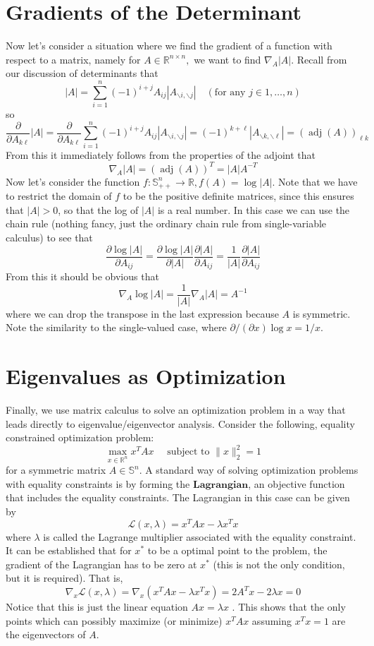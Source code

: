 \documentclass[10pt,a4paper,oneside]{article}
\begin{document}
\section{Gradients of the Determinant}
Now let's consider a situation where we find the gradient of a function with respect to a matrix, namely for \(A \in \mathbb{R}^{n \times n},\) we want to find \(\nabla_{A}|A| .\) Recall from our discussion of determinants that
\[
|A|=\sum_{i=1}^{n}(-1)^{i+j} A_{i j}\left|A_{\backslash i, \backslash j}\right| \quad(\text {for any } j \in 1, \ldots, n)
\]
so
\[
\frac{\partial}{\partial A_{k \ell}}|A|=\frac{\partial}{\partial A_{k \ell}} \sum_{i=1}^{n}(-1)^{i+j} A_{i j}\left|A_{\backslash i, \backslash j}\right|=(-1)^{k+\ell}\left|A_{\backslash k, \backslash\ell}\right|=(\operatorname{adj}(A))_{\ell k}
\]
From this it immediately follows from the properties of the adjoint that
\[
\nabla_{A}|A|=(\operatorname{adj}(A))^{T}=|A| A^{-T}
\]
Now let's consider the function \(f : \mathbb{S}_{++}^{n} \rightarrow \mathbb{R}, f(A)=\log |A|\). Note that we have to restrict the domain of \(f\) to be the positive definite matrices, since this ensures that \(|A|>0\), so that the log of \(|A|\) is a real number. In this case we can use the chain rule (nothing fancy, just the ordinary chain rule from single-variable calculus) to see that
\[
\frac{\partial \log |A|}{\partial A_{i j}}=\frac{\partial \log |A|}{\partial|A|} \frac{\partial|A|}{\partial A_{i j}}=\frac{1}{|A|} \frac{\partial|A|}{\partial A_{i j}}
\]
From this it should be obvious that
\[
\nabla_{A} \log |A|=\frac{1}{|A|} \nabla_{A}|A|=A^{-1}
\]
where we can drop the transpose in the last expression because \(A\) is symmetric. Note the similarity to the single-valued case, where \(\partial /(\partial x) \log x=1 / x\).
\section{Eigenvalues as Optimization}
Finally, we use matrix calculus to solve an optimization problem in a way that leads directly
to eigenvalue/eigenvector analysis. Consider the following, equality constrained optimization
problem:
\[
\max _{x \in \mathbb{R}^{n}} x^{T} A x \quad \text { subject to }\|x\|_{2}^{2}=1
\]
for a symmetric matrix \(A \in \mathbb{S}^{n}\). A standard way of solving optimization problems with equality constraints is by forming the $\bm{Lagrangian}$, an objective function that includes the equality constraints. The Lagrangian in this case can be given by
\[
\mathcal{L}(x, \lambda)=x^{T} A x-\lambda x^{T} x
\]
where \(\lambda\) is called the Lagrange multiplier associated with the equality constraint. It can be established that for \(x^{*}\) to be a optimal point to the problem, the gradient of the Lagrangian has to be zero at \(x^{*}\) (this is not the only condition, but it is required). That is,
\[
\nabla_{x} \mathcal{L}(x, \lambda)=\nabla_{x}\left(x^{T} A x-\lambda x^{T} x\right)=2 A^{T} x-2 \lambda x=0
\]
Notice that this is just the linear equation \(A x=\lambda x\) . This shows that the only points which
can possibly maximize (or minimize) \(x^{T} A x\) assuming \(x^{T} x=1\) are the eigenvectors of \(A .\)
\end{document}
